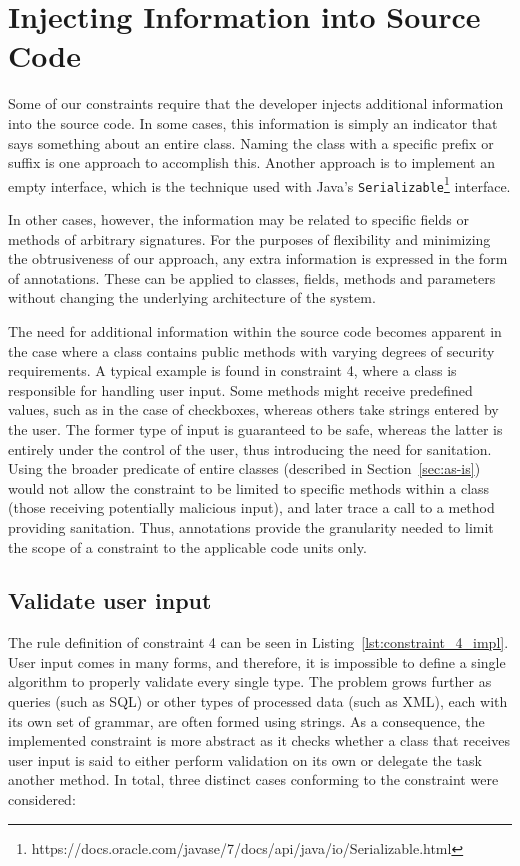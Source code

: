 \section{Injecting Information into Source Code}

Some of our constraints require that the developer injects additional information into the source code. In some cases, this information is simply an indicator that says something about an entire class. Naming the class with a specific prefix or suffix is one approach to accomplish this. Another approach is to implement an empty interface, which is the technique used with Java's \texttt{Serializable}\footnote{https://docs.oracle.com/javase/7/docs/api/java/io/Serializable.html} interface. 

In other cases, however, the information may be related to specific fields or methods of arbitrary signatures. For the purposes of flexibility and minimizing the obtrusiveness of our approach, any extra information is expressed in the form of annotations. These can be applied to classes, fields, methods and parameters without changing the underlying architecture of the system.

The need for additional information within the source code becomes apparent in the case where a class contains public methods with varying degrees of security requirements. A typical example is found in constraint 4, where a class is responsible for handling user input. Some methods might receive predefined values, such as in the case of checkboxes, whereas others take strings entered by the user. The former type of input is guaranteed to be safe, whereas the latter is entirely under the control of the user, thus introducing the need for sanitation. Using the broader predicate of entire classes (described in Section~\ref{sec:as-is}) would not allow the constraint to be limited to specific methods within a class (those receiving potentially malicious input), and later trace a call to a method providing sanitation. Thus, annotations provide the granularity needed to limit the scope of a constraint to the applicable code units only.

\subsection{Validate user input}
The rule definition of constraint 4 can be seen in Listing~\ref{lst:constraint_4_impl}.
User input comes in many forms, and therefore, it is impossible to define a single algorithm to properly validate every single type. The problem grows further as queries (such as SQL) or other types of processed data (such as XML), each with its own set of grammar, are often formed using strings. As a consequence, the implemented constraint is more abstract as it checks whether a class that receives user input is said to either perform validation on its own or delegate the task another method. In total, three distinct cases conforming to the constraint were considered: 

